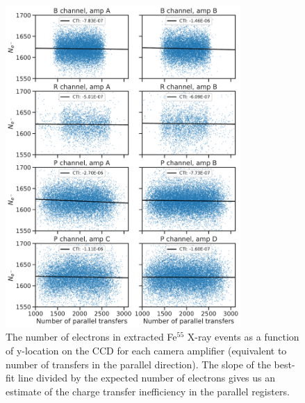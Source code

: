 \begin{figure}[htbp]
    \centering
    \includegraphics[width=0.8\textwidth]{figures/cte/xray_cte_parallel.pdf}
    \caption{The number of electrons in extracted Fe$^{55}$ X-ray events as a function of y-location on the CCD for each camera amplifier (equivalent to number of transfers in the parallel direction). The slope of the best-fit line divided by the expected number of electrons gives us an estimate of the charge transfer inefficiency in the parallel registers.}
    \label{fig:cte_xray}
\end{figure}

